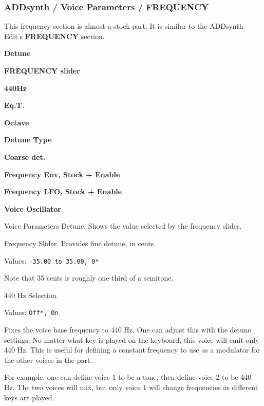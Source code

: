 \subsubsection{ADDsynth / Voice Parameters / FREQUENCY}
\label{subsubsec:addsynth_voice_parameters_frequency}

   This frequency section is almost a stock part.
   It is similar to the ADDsynth Edit's \textbf{FREQUENCY} section.

   \begin{enumber}
      \item \textbf{Detune}
      \item \textbf{FREQUENCY slider}
      \item \textbf{440Hz}          %
      \item \textbf{Eq.T.}          %
      \item \textbf{Octave}
      \item \textbf{Detune Type}
      \item \textbf{Coarse det.}
      \item \textbf{Frequency Env, Stock + Enable}
      \item \textbf{Frequency LFO, Stock + Enable}
      \item \textbf{Voice Oscillator}
   \end{enumber}

   \setcounter{ItemCounter}{0}      %

   Voice Parameters Detune.
   Shows the value selected by the frequency slider.

   Frequency Slider.
   Provides fine detune, in cents.

   Values: \texttt{-35.00 to 35.00, 0*}

   Note that 35 cents is roughly one-third of a semitone.

   440 Hz Selection.

   Values: \texttt{Off*, On}

   Fixes the voice base frequency to 440 Hz.
   One can adjust this with the detune settings.
   No matter what key is played on the keyboard, this voice will emit only
   440 Hz.  This is useful for defining a constant frequency to use as a
   modulator for the other voices in the part.

   For example, one can define voice 1 to be a tone, then
   define voice 2 to be 440 Hz.  The two voices will mix, but only voice 1
   will change frequencies as different keys are played.


